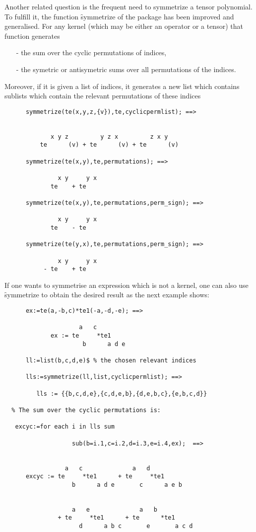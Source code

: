 Another related question is the frequent need to symmetrize
a tensor polynomial.
To fulfill it, the function \f{symmetrize}
of the package  has been improved and
generalised. For any kernel (which may be either
an operator or a tensor) that function generates
\begin{itemize}
\item[-] the sum over the cyclic permutations of indices,
\item[-] the symetric or antisymetric sums over all permutations
of the  indices.
\end{itemize}
Moreover, if it is given a list of indices, it generates a new list
which contains sublists which contain  the relevant permutations of
these indices
\begin{verbatim}
      symmetrize(te(x,y,z,{v}),te,cyclicpermlist); ==>


             x y z         y z x         z x y
          te      (v) + te      (v) + te      (v)

      symmetrize(te(x,y),te,permutations); ==>

               x y     y x
             te    + te

      symmetrize(te(x,y),te,permutations,perm_sign); ==>

               x y     y x
             te    - te

      symmetrize(te(y,x),te,permutations,perm_sign); ==>

               x y     y x
           - te    + te
\end{verbatim}
If one wants to symmetrise an expression which is not a kernel, one
can also use \f{symmetrize} to obtain the desired result as the next
example shows:
\begin{verbatim}
      ex:=te(a,-b,c)*te1(-a,-d,-e); ==>

                     a   c
             ex := te     *te1
                      b      a d e

      ll:=list(b,c,d,e)$ % the chosen relevant indices

      lls:=symmetrize(ll,list,cyclicpermlist); ==>

         lls := {{b,c,d,e},{c,d,e,b},{d,e,b,c},{e,b,c,d}}

  % The sum over the cyclic permutations is:

   excyc:=for each i in lls sum

                   sub(b=i.1,c=i.2,d=i.3,e=i.4,ex);  ==>


                 a   c              a   d
      excyc := te     *te1      + te     *te1
                   b      a d e       c      a e b


                   a   e              a   b
               + te     *te1      + te      *te1
                     d      a b c       e       a c d
\end{verbatim}

